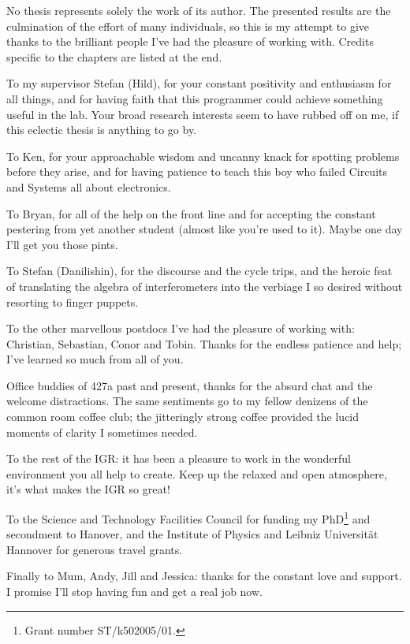 No thesis represents solely the work of its author. The presented results are the culmination of the effort of many individuals, so this is my attempt to give thanks to the brilliant people I've had the pleasure of working with. Credits specific to the chapters are listed at the end.

\bigskip

To my supervisor Stefan (Hild), for your constant positivity and enthusiasm for all things, and for having faith that this programmer could achieve something useful in the lab. Your broad research interests seem to have rubbed off on me, if this eclectic thesis is anything to go by.

To Ken, for your approachable wisdom and uncanny knack for spotting problems before they arise, and for having patience to teach this boy who failed Circuits and Systems all about electronics.

To Bryan, for all of the help on the front line and for accepting the constant pestering from yet another student (almost like you're used to it). Maybe one day I'll get you those pints.

To Stefan (Danilishin), for the discourse and the cycle trips, and the heroic feat of translating the algebra of interferometers into the verbiage I so desired without resorting to finger puppets.

To the other marvellous postdocs I've had the pleasure of working with: Christian, Sebastian, Conor and Tobin. Thanks for the endless patience and help; I've learned so much from all of you.

Office buddies of 427a past and present, thanks for the absurd chat and the welcome distractions. The same sentiments go to my fellow denizens of the common room coffee club; the jitteringly strong coffee provided the lucid moments of clarity I sometimes needed.

To the rest of the IGR: it has been a pleasure to work in the wonderful environment you all help to create. Keep up the relaxed and open atmosphere, it's what makes the IGR so great!

To the Science and Technology Facilities Council for funding my PhD\footnote{Grant number ST/k502005/01.} and secondment to Hanover, and the Institute of Physics and Leibniz Universit\"{a}t Hannover for generous travel grants.

Finally to Mum, Andy, Jill and Jessica: thanks for the constant love and support. I promise I'll stop having fun and get a real job now.

